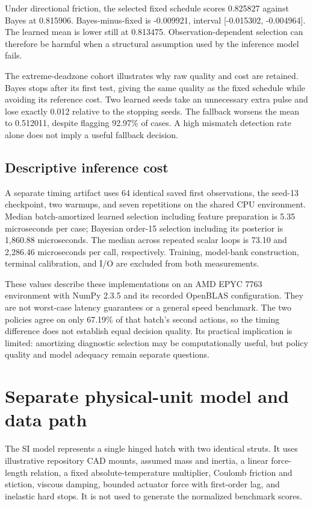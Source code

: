 \documentclass[
  10pt,
]{article}
\begin{document}
Under directional friction, the selected fixed schedule scores 0.825827
against Bayes at 0.815906. Bayes-minus-fixed is -0.009921, interval
{[}-0.015302, -0.004964{]}. The learned mean is lower still at 0.813475.
Observation-dependent selection can therefore be harmful when a
structural assumption used by the inference model fails.

The extreme-deadzone cohort illustrates why raw quality and cost are
retained. Bayes stops after its first test, giving the same quality as
the fixed schedule while avoiding its reference cost. Two learned seeds
take an unnecessary extra pulse and lose exactly 0.012 relative to the
stopping seeds. The fallback worsens the mean to 0.512011, despite
flagging 92.97\% of cases. A high mismatch detection rate alone does not
imply a useful fallback decision.

\subsection{Descriptive inference
cost}\label{descriptive-inference-cost}

A separate timing artifact uses 64 identical saved first observations,
the seed-13 checkpoint, two warmups, and seven repetitions on the shared
CPU environment. Median batch-amortized learned selection including
feature preparation is 5.35 microseconds per case; Bayesian order-15
selection including its posterior is 1,860.88 microseconds. The median
across repeated scalar loops is 73.10 and 2,286.46 microseconds per
call, respectively. Training, model-bank construction, terminal
calibration, and I/O are excluded from both measurements.

These values describe these implementations on an AMD EPYC 7763
environment with NumPy 2.3.5 and its recorded OpenBLAS configuration.
They are not worst-case latency guarantees or a general speed benchmark.
The two policies agree on only 67.19\% of that batch's second actions,
so the timing difference does not establish equal decision quality. Its
practical implication is limited: amortizing diagnostic selection may be
computationally useful, but policy quality and model adequacy remain
separate questions.

\section{Separate physical-unit model and data
path}\label{separate-physical-unit-model-and-data-path}

The SI model represents a single hinged hatch with two identical struts.
It uses illustrative repository CAD mounts, assumed mass and inertia, a
linear force-length relation, a fixed absolute-temperature multiplier,
Coulomb friction and stiction, viscous damping, bounded actuator force
with first-order lag, and inelastic hard stops. It is not used to
generate the normalized benchmark scores.
\end{document}
